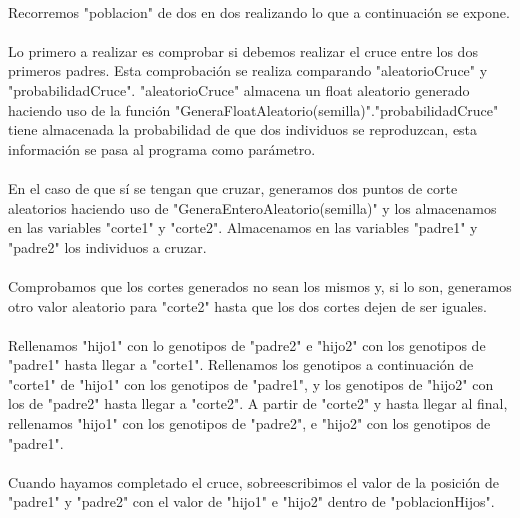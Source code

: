	\paragraph{}Recorremos "poblacion" de dos en dos realizando lo que a continuación se expone.
	
	\paragraph{}Lo primero a realizar es comprobar si debemos realizar el cruce entre los dos primeros padres. Esta comprobación se realiza comparando "aleatorioCruce" y "probabilidadCruce". "aleatorioCruce" almacena un float aleatorio generado haciendo uso de la función "GeneraFloatAleatorio(semilla)"."probabilidadCruce" tiene almacenada la probabilidad de que dos individuos se reproduzcan, esta información se pasa al programa como parámetro.
	
	\paragraph{}En el caso de que sí se tengan que cruzar, generamos dos puntos de corte aleatorios haciendo uso de "GeneraEnteroAleatorio(semilla)" y los almacenamos en las variables "corte1" y "corte2". Almacenamos en las variables "padre1" y "padre2" los individuos a cruzar.
	
	\paragraph{}Comprobamos que los cortes generados no sean los mismos y, si lo son, generamos otro valor aleatorio para "corte2" hasta que los dos cortes dejen de ser iguales.
	
	\paragraph{}Rellenamos "hijo1" con lo genotipos de "padre2" e "hijo2" con los genotipos de "padre1" hasta llegar a "corte1". Rellenamos los genotipos a continuación de "corte1" de "hijo1" con los genotipos de "padre1", y los genotipos de "hijo2" con los de "padre2" hasta llegar a "corte2". A partir de "corte2" y hasta llegar al final, rellenamos "hijo1" con los genotipos de "padre2", e "hijo2" con los genotipos de "padre1".
	
	\paragraph{}Cuando hayamos completado el cruce, sobreescribimos el valor de la posición de "padre1" y "padre2" con el valor de "hijo1" e "hijo2" dentro de  "poblacionHijos". 
	
